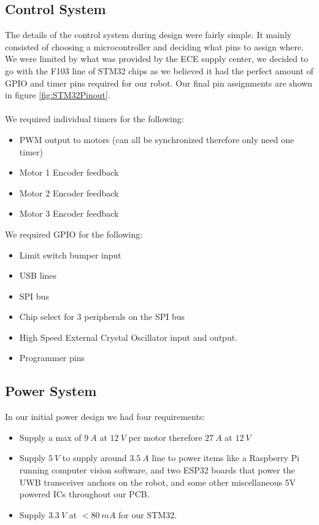 \documentclass{report}
\begin{document}
    \subsection{Control System}

    The details of the control system during design were fairly simple. It mainly consisted of choosing a microcontroller and deciding what pins to assign where. We were limited by what was provided by the ECE supply center, we decided to go with the F103 line of STM32 chips as we believed it had the perfect amount of GPIO and timer pins required for our robot. Our final pin assignments are shown in figure \ref{fig:STM32Pinout}.
    \\
    \\
    We required individual timers for the following:
    \begin{itemize}
      \item PWM output to motors (can all be synchronized therefore only need one timer)
      \item Motor 1 Encoder feedback
      \item Motor 2 Encoder feedback
      \item Motor 3 Encoder feedback
    \end{itemize}
We required GPIO for the following:

    \begin{itemize}
      \item Limit switch bumper input
      \item USB lines
      \item SPI bus
      \item Chip select for 3 peripherals on the SPI bus
      \item High Speed External Crystal Oscillator input and output.
      \item Programmer pins
    \end{itemize}
    
    \subsection{Power System}

    In our initial power design we had four requirements:

    \begin{itemize}
      \item Supply a max of $9~A$ at $12~V$ per motor therefore $27~A$ at $12~V$
      \item Supply $5~V$ to supply around $3.5~A$ line to power items like a Raspberry Pi running computer vision software, and two ESP32 boards that power the UWB transceiver anchors on the robot, and some other miscellaneous 5V powered ICs throughout our PCB.
      \item Supply $3.3~V$ at $< 80~mA$ for our STM32.
    \end{itemize}
\end{document}
